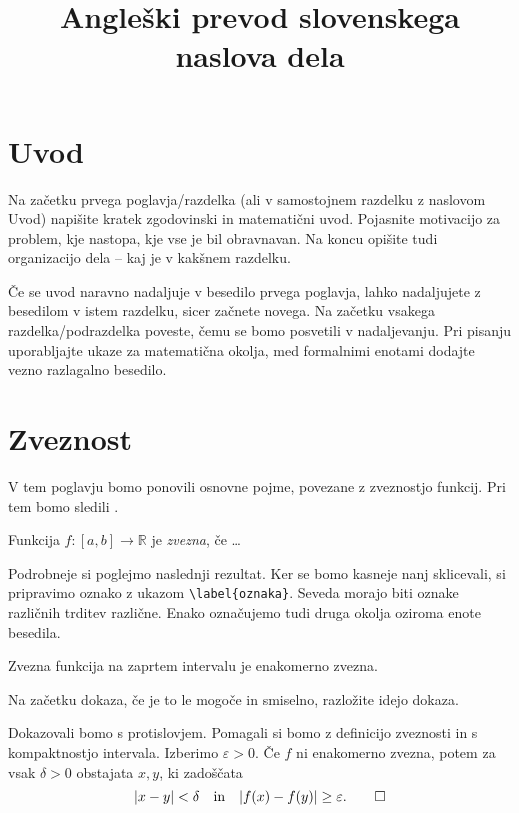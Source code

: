 \documentclass[mat1]{fmfdelo}
\title{Angleški prevod slovenskega naslova dela}
\newcommand{\R}{\mathbb R}
\begin{document}
\section{Uvod}

Na začetku prvega poglavja/razdelka (ali v samostojnem razdelku z naslovom Uvod) napišite kratek zgodovinski in matematični uvod. Pojasnite motivacijo za problem, kje nastopa, kje vse je bil obravnavan. Na koncu opišite tudi organizacijo dela -- kaj je v kakšnem razdelku.

Če se uvod naravno nadaljuje v besedilo prvega poglavja, lahko nadaljujete z besedilom v istem razdelku, sicer začnete novega. Na začetku vsakega razdelka/podraz\-delka poveste, čemu se bomo posvetili v nadaljevanju. Pri pisanju uporabljajte ukaze za matematična okolja, med formalnimi enotami dodajte vezno razlagalno besedilo.

\section{Zveznost}

V tem poglavju bomo ponovili osnovne pojme, povezane z zveznostjo funkcij. Pri tem bomo sledili \cite{glob}.

\begin{definicija}
Funkcija $f\colon [a,b]\to\R$ je {\em zvezna}, če \ldots
\end{definicija}

Podrobneje si poglejmo naslednji rezultat. Ker se bomo kasneje nanj sklicevali, si pripravimo oznako z ukazom \verb|\label{oznaka}|. Seveda morajo biti oznake različnih trditev različne. Enako označujemo tudi druga okolja oziroma enote besedila.

\begin{izrek}\label{izr:enakomerno}
Zvezna funkcija na zaprtem intervalu je enakomerno zvezna.
\end{izrek}

\begin{dokaz}
Na začetku dokaza, če je to le mogoče in smiselno, razložite idejo dokaza. 

Dokazovali bomo s protislovjem. Pomagali si bomo z definicijo zveznosti in s kompaktnostjo intervala.
Izberimo $\varepsilon>0$. Če $f$ ni enakomerno zvezna, potem za vsak $\delta>0$ obstajata $x, y$, ki zadoščata
\begin{equation}\label{eq:razlika}
|x-y|<\delta\quad \text{in}\quad |f(x)-f(y)| \ge \varepsilon. \qedhere
\end{equation}
\end{dokaz}
\end{document}
